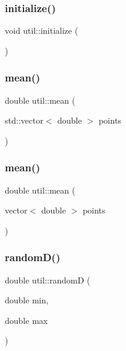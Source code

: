 \mbox{\label{namespaceutil_a60fc54ed78936dca89472845766b61f8}} 
\subsubsection{\texorpdfstring{initialize()}{initialize()}}
{\footnotesize\ttfamily void util\+::initialize (\begin{DoxyParamCaption}{ }\end{DoxyParamCaption})}

\mbox{\label{namespaceutil_a67baa21858f5d569c1553bb179da7115}} 
\subsubsection{\texorpdfstring{mean()}{mean()}\hspace{0.1cm}{\footnotesize\ttfamily [1/2]}}
{\footnotesize\ttfamily double util\+::mean (\begin{DoxyParamCaption}\item[{std\+::vector$<$ double $>$}]{points }\end{DoxyParamCaption})}

\mbox{\label{namespaceutil_afded8090794a80d2f1c9aa44e70c85ff}} 
\subsubsection{\texorpdfstring{mean()}{mean()}\hspace{0.1cm}{\footnotesize\ttfamily [2/2]}}
{\footnotesize\ttfamily double util\+::mean (\begin{DoxyParamCaption}\item[{vector$<$ double $>$}]{points }\end{DoxyParamCaption})}

\mbox{\label{namespaceutil_a1327645fe6fef26083bc9e1185b8d586}} 
\subsubsection{\texorpdfstring{random\+D()}{randomD()}}
{\footnotesize\ttfamily double util\+::randomD (\begin{DoxyParamCaption}\item[{double}]{min,  }\item[{double}]{max }\end{DoxyParamCaption})}

